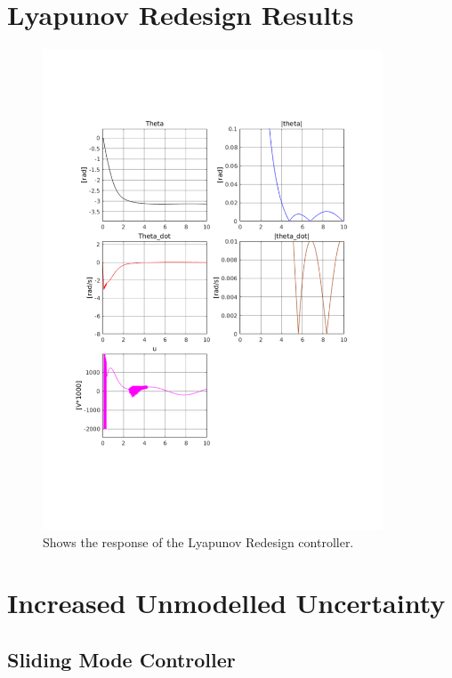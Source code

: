 \chapter{Lyapunov Redesign Results} %
\label{cha:lyapunov_redesign_results}
\begin{figure}[H]
        \centering
        \includegraphics[width=0.9\textwidth,trim=0.5cm 5cm 0.5cm 4cm, clip]{lyap.pdf}
        \caption{Shows the response of the Lyapunov Redesign controller.}
        \label{fig:lyap}
\end{figure}


\chapter{Increased Unmodelled Uncertainty} %
\label{cha:extreme_dis}
\section{Sliding Mode Controller} %
\label{sec:sliding_mode_controller}

